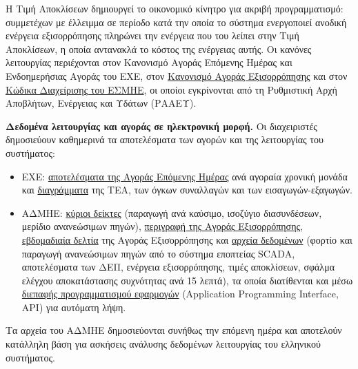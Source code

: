 Η Τιμή Αποκλίσεων δημιουργεί το οικονομικό κίνητρο για ακριβή προγραμματισμό: συμμετέχων με
έλλειμμα σε περίοδο κατά την οποία το σύστημα ενεργοποιεί ανοδική ενέργεια εξισορρόπησης
πληρώνει την ενέργεια που του λείπει στην Τιμή Αποκλίσεων, η οποία αντανακλά το κόστος της
ενέργειας αυτής. Οι κανόνες λειτουργίας περιέχονται στον
Κανονισμό Αγοράς Επόμενης Ημέρας και Ενδοημερήσιας Αγοράς του ΕΧΕ, στον
\href{https://www.admie.gr/agora/rythmistiko-plaisio-agoras/kanonismos-agoras-eksisorropisis}{Κανονισμό
Αγοράς Εξισορρόπησης} και στον
\href{https://www.admie.gr/agora/rythmistiko-plaisio-agoras/kodikas-diaxeirisis-esmie}{Κώδικα
Διαχείρισης του ΕΣΜΗΕ}, οι οποίοι εγκρίνονται από τη Ρυθμιστική Αρχή Αποβλήτων, Ενέργειας και
Υδάτων (ΡΑΑΕΥ).

\textbf{Δεδομένα λειτουργίας και αγοράς σε ηλεκτρονική μορφή.} Οι διαχειριστές δημοσιεύουν
καθημερινά τα αποτελέσματα των αγορών και της λειτουργίας του συστήματος:

\begin{itemize}
\item ΕΧΕ:
      \href{https://www.enexgroup.gr/el/web/guest/markets-publications-el-day-ahead-market}{αποτελέσματα
      της Αγοράς Επόμενης Ημέρας} ανά αγοραία χρονική μονάδα και
      \href{https://www.enexgroup.gr/el/web/guest/day-ahead-market-figures}{διαγράμματα} της ΤΕΑ,
      των όγκων συναλλαγών και των εισαγωγών-εξαγωγών.
\item ΑΔΜΗΕ:
      \href{https://www.admie.gr/agora/statistika-agoras/kyrioi-deiktes-dashboard/paragogi-ana-kaysimo-isozygio-diasyndeseon}{κύριοι
      δείκτες} (παραγωγή ανά καύσιμο, ισοζύγιο διασυνδέσεων, μερίδιο ανανεώσιμων πηγών),
      \href{https://www.admie.gr/agora/genika/agora-eksisorropisis}{περιγραφή της Αγοράς
      Εξισορρόπησης},
      \href{https://www.admie.gr/agora/enimerotika-deltia/ebdomadiaia-deltia-agoras-eksisorropisis}{εβδομαδιαία
      δελτία} της Αγοράς Εξισορρόπησης και
      \href{https://www.admie.gr/agora/statistika-agoras/dedomena}{αρχεία δεδομένων} (φορτίο και
      παραγωγή ανανεώσιμων πηγών από το σύστημα εποπτείας SCADA, αποτελέσματα των ΔΕΠ, ενέργεια εξισορρόπησης,
      τιμές αποκλίσεων, σφάλμα ελέγχου αποκατάστασης συχνότητας ανά 15 λεπτά), τα οποία
      διατίθενται και μέσω
      \href{https://www.admie.gr/agora/statistika-agoras/file-download-api}{διεπαφής
      προγραμματισμού εφαρμογών} (Application Programming Interface, API) για αυτόματη λήψη.
\end{itemize}

Τα αρχεία του ΑΔΜΗΕ δημοσιεύονται συνήθως την επόμενη ημέρα και αποτελούν κατάλληλη βάση για
ασκήσεις ανάλυσης δεδομένων λειτουργίας του ελληνικού συστήματος.

